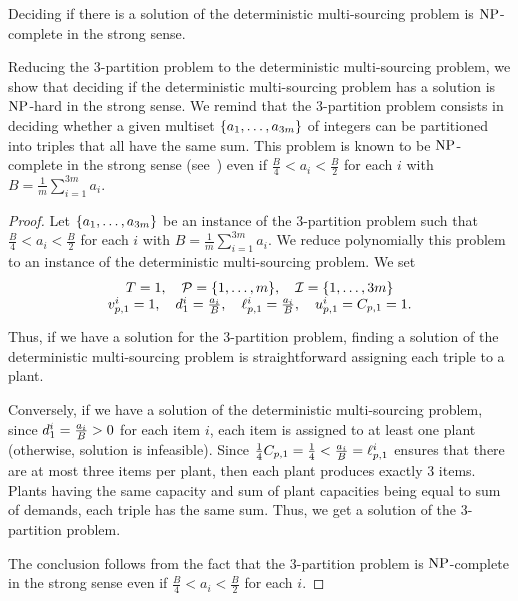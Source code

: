 \begin{thm}\label{thm:deterministic-multi-sourcing:strong-NP-hard}
  Deciding if there is a solution of the deterministic multi-sourcing problem is $\operatorname{NP}$-complete in the strong sense.
\end{thm}


Reducing the 3-partition problem to the deterministic multi-sourcing problem, we show that deciding if the deterministic multi-sourcing problem has a solution is $\operatorname{NP}$-hard in the strong sense.
We remind that the 3-partition problem consists in deciding whether a given multiset $\crbracket{a_1,\ldots,a_{3m}}$ of integers can be partitioned into triples that all have the same sum.
This problem is known to be $\operatorname{NP}$-complete in the strong sense (see~\citet{Garey1979}) even if $\frac{B}{4} < a_i < \frac{B}{2}$ for each $i$ with $B=\frac{1}{m}\sum_{i=1}^{3m}a_i$.


\begin{proof}
Let $\crbracket{a_1,\ldots,a_{3m}}$ be an instance of the 3-partition problem such that $\frac{B}{4} < a_i < \frac{B}{2}$ for each $i$ with $B=\frac{1}{m}\sum_{i=1}^{3m}a_i$.
We reduce polynomially this problem to an instance of the deterministic multi-sourcing problem.
We set
\begin{equation}
\begin{array}{c}
  \horizon=1
  ,\quad
  \plants=\range[1]{m}
  ,\quad
  \REF=\range[1]{3m}
\\ \smallskip
  \rate_{p,1}^i=1
  ,\quad
  \demand_1^i=\frac{a_i}{B}
  ,\quad
  \lb_{p,1}^i=\frac{a_i}{B}
  ,\quad
  \ub_{p,1}^i=\capacity_{p,1}=1.
\end{array}
\end{equation}
Thus, if we have a solution for the 3-partition problem, finding a solution of the deterministic multi-sourcing problem is straightforward assigning each triple to a plant.


Conversely, if we have a solution of the deterministic multi-sourcing problem, since $d_1^i=\frac{a_i}{B}>0$ for each item $i$, each item is assigned to at least one plant (otherwise, solution is infeasible).
Since $\frac{1}{4}C_{p,1}=\frac{1}{4} < \frac{a_i}{B} = \ell_{p,1}^i$ ensures that there are at most three items per plant, then each plant produces exactly 3 items.
Plants having the same capacity and sum of plant capacities being equal to sum of demands, each triple has the same sum.
Thus, we get a solution of the 3-partition problem.


The conclusion follows from the fact that the 3-partition problem is $\operatorname{NP}$-complete in the strong sense even if $\frac{B}{4} < a_i < \frac{B}{2}$ for each $i$.
\end{proof}


